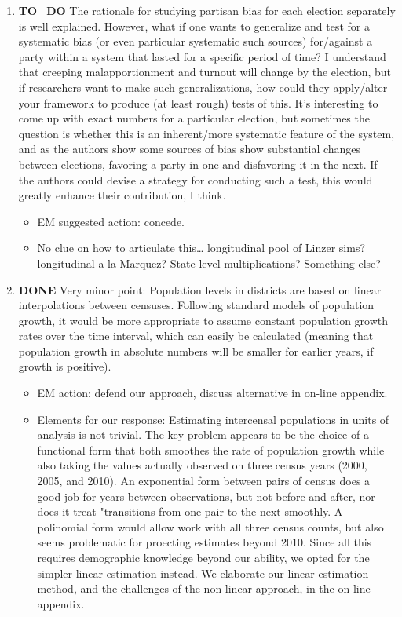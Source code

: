 \documentclass{article}
\begin{document}
\begin{enumerate}
\begin{itemize}
\end{itemize}
\item {\bfseries\sffamily TO\_DO} The rationale for studying partisan bias for each election separately is well explained. However, what if one wants to generalize and test for a systematic bias (or even particular systematic such sources) for/against a party within a system that lasted for a specific period of time? I understand that creeping malapportionment and turnout will change by the election, but if researchers want to make such generalizations, how could they apply/alter your framework to produce (at least rough) tests of this. It's interesting to come up with exact numbers for a particular election, but sometimes the question is whether this is an inherent/more systematic feature of the system, and as the authors show some sources of bias show substantial changes between elections, favoring a party in one and disfavoring it in the next. If the authors could devise a strategy for conducting such a test, this would greatly enhance their contribution, I think.
\label{sec:orgheadline13}
\begin{itemize}
\item EM suggested action: concede.
\item No clue on how to articulate this\ldots{} longitudinal pool of Linzer sims? longitudinal a la Marquez? State-level multiplications? Something else?
\end{itemize}
\item {\bfseries\sffamily DONE} Very minor point: Population levels in districts are based on linear interpolations between censuses. Following standard models of population growth, it would be more appropriate to assume constant population growth rates over the time interval, which can easily be calculated (meaning that population growth in absolute numbers will be smaller for earlier years, if growth is positive).
\label{sec:orgheadline14}
\begin{itemize}
\item EM action: defend our approach, discuss alternative in on-line appendix.
\item Elements for our response: Estimating intercensal populations in units of analysis is not trivial. The key problem appears to be the choice of a functional form that both smoothes the rate of population growth while also taking the values actually observed on three census years (2000, 2005, and 2010). An exponential form between pairs of census does a good job for years between observations, but not before and after, nor does it treat "transitions from one pair to the next smoothly. A polinomial form would allow work with all three census counts, but also seems problematic for proecting estimates beyond 2010. Since all this requires demographic knowledge beyond our ability, we opted for the simpler linear estimation instead. We elaborate our linear estimation method, and the challenges of the non-linear approach, in the on-line appendix.

\end{itemize}
\end{enumerate}
\end{document}
